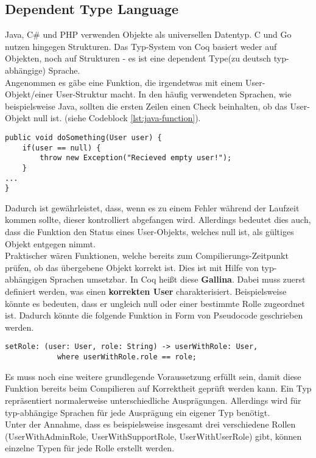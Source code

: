 \subsection{Dependent Type Language}
Java, C\# und PHP verwenden Objekte als universellen Datentyp. C und Go nutzen hingegen Strukturen. Das Typ-System von Coq basiert weder auf Objekten, noch auf Strukturen - es ist eine dependent Type(zu deutsch typ-abhängige) Sprache.\\
Angenommen es gäbe eine Funktion, die irgendetwas mit einem User-Objekt/einer User-Struktur macht. In den häufig verwendeten Sprachen, wie beispielsweise Java, sollten die ersten Zeilen einen Check beinhalten, ob das User-Objekt null ist. (siehe Codeblock \ref{lst:java-function}).
\begin{lstlisting}[language=coq,firstnumber=1,caption=Java Funktion für den initialen Check auf null des User Objektes,label=lst:java-function]
public void doSomething(User user) {
	if(user == null) {
		throw new Exception("Recieved empty user!");
	}
...
}
\end{lstlisting}
Dadurch ist gewährleistet, dass, wenn es zu einem Fehler während der Laufzeit kommen sollte, dieser kontrolliert abgefangen wird. Allerdings bedeutet dies auch, dass die Funktion den Status eines User-Objekts, welches null ist, als gültiges Objekt entgegen nimmt.\\
Praktischer wären Funktionen, welche bereits zum Compilierungs-Zeitpunkt prüfen, ob das übergebene Objekt korrekt ist.
Dies ist mit Hilfe von typ-abhängigen Sprachen umsetzbar. In Coq heißt diese \textbf{Gallina}. Dabei muss zuerst definiert werden, was einen \textbf{korrekten User} charakterisiert. Beispielsweise könnte es bedeuten, dass er ungleich null oder einer bestimmte Rolle zugeordnet ist. Dadurch könnte die folgende Funktion in Form von Pseudocode geschrieben werden.
\begin{lstlisting}[language=coq,firstnumber=1,caption=Pseudocode Check auf null des User Objektes,label=lst:pseudocode-checked-function]
setRole: (user: User, role: String) -> userWithRole: User,
			where userWithRole.role == role;
\end{lstlisting}
Es muss noch eine weitere grundlegende Voraussetzung erfüllt sein, damit diese Funktion bereits beim Compilieren auf Korrektheit geprüft werden kann. Ein Typ repräsentiert normalerweise unterschiedliche Ausprägungen. Allerdings wird für typ-abhängige Sprachen für jede Ausprägung ein eigener Typ benötigt.\\
Unter der Annahme, dass es beispielsweise insgesamt drei verschiedene Rollen (UserWithAdminRole, UserWithSupportRole, UserWithUserRole) gibt, können einzelne Typen für jede Rolle erstellt werden.
